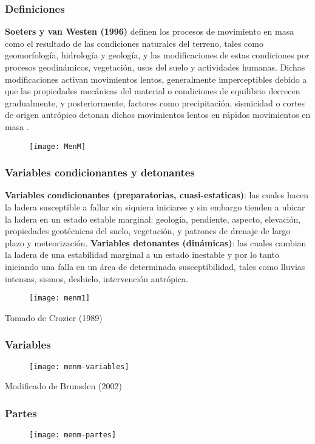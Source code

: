\documentclass[12pt]{beamer}
\begin{document}
\begin{frame}
\frametitle{Definiciones}
\scriptsize{
\justifying
\textbf{Soeters y van Westen (1996)} definen los procesos de movimiento en masa como el resultado de las condiciones naturales del terreno, tales como geomorfología, hidrología y geología, y las modificaciones de estas condiciones por procesos geodinámicos, vegetación, usos del suelo y actividades humanas. Dichas modificaciones activan movimientos lentos, generalmente imperceptibles debido a que las propiedades mecánicas del material o condiciones de equilibrio decrecen gradualmente, y posteriormente, factores como precipitación, sismicidad o cortes de origen antrópico detonan dichos movimientos lentos en rápidos movimientos en masa .
\vfill
\begin{figure}
\centering
\texttt{[image: MenM]} 
\end{figure}
}
\end{frame}
\begin{frame}
\frametitle{Variables condicionantes y detonantes}
\scriptsize{
\justifying
\textbf{Variables condicionantes (preparatorias, cuasi-estaticas)}: las cuales hacen la ladera susceptible a fallar sin siquiera iniciarse  y sin embargo tienden a ubicar la ladera en un estado estable marginal: geología, pendiente, aspecto, elevación, propiedades geotécnicas del suelo, vegetación, y patrones de drenaje de largo plazo y meteorización.
\vfill
\textbf{Variables detonantes (dinámicas)}: las cuales cambian la ladera de una estabilidad marginal a un estado inestable y por lo tanto iniciando una falla en un área de determinada susceptibilidad, tales como lluvias intensas, sismos, deshielo, intervención antrópica. 
\vfill
\begin{figure}
\centering
\texttt{[image: menm1]} 
\end{figure}
}
\tiny{Tomado de Crozier (1989)}
\end{frame}
\begin{frame}
\frametitle{Variables}
\begin{figure}
\centering
\texttt{[image: menm-variables]} 
\end{figure}
\tiny{Modificado de Brunsden (2002)}
\end{frame}
\begin{frame}
\frametitle{Partes}
\begin{figure}
\centering
\texttt{[image: menm-partes]} 
\end{figure}
\end{frame}
\end{document}
